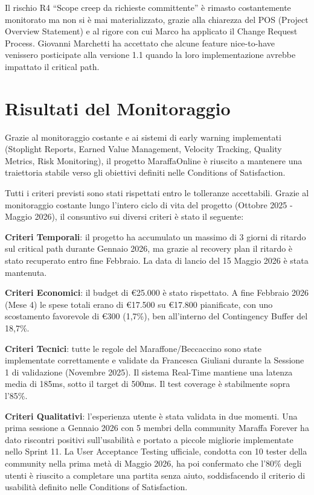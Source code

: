 Il rischio R4 ``Scope creep da richieste committente'' è rimasto costantemente monitorato ma non si è mai materializzato, grazie alla chiarezza del POS (Project Overview Statement) e al rigore con cui Marco ha applicato il Change Request Process. Giovanni Marchetti ha accettato che alcune feature nice-to-have venissero posticipate alla versione 1.1 quando la loro implementazione avrebbe impattato il critical path.

\section{Risultati del Monitoraggio}

Grazie al monitoraggio costante e ai sistemi di early warning implementati (Stoplight Reports, Earned Value Management, Velocity Tracking, Quality Metrics, Risk Monitoring), il progetto MaraffaOnline è riuscito a mantenere una traiettoria stabile verso gli obiettivi definiti nelle Conditions of Satisfaction.

Tutti i criteri previsti sono stati rispettati entro le tolleranze accettabili. Grazie al monitoraggio costante lungo l'intero ciclo di vita del progetto (Ottobre 2025 - Maggio 2026), il consuntivo sui diversi criteri è stato il seguente:

\textbf{Criteri Temporali}: il progetto ha accumulato un massimo di 3 giorni di ritardo sul critical path durante Gennaio 2026, ma grazie al recovery plan il ritardo è stato recuperato entro fine Febbraio. La data di lancio del 15 Maggio 2026 è stata mantenuta.

\textbf{Criteri Economici}: il budget di €25.000 è stato rispettato. A fine Febbraio 2026 (Mese 4) le spese totali erano di €17.500 su €17.800 pianificate, con uno scostamento favorevole di €300 (1,7\%), ben all'interno del Contingency Buffer del 18,7\%.

\textbf{Criteri Tecnici}: tutte le regole del Maraffone/Beccaccino sono state implementate correttamente e validate da Francesca Giuliani durante la Sessione 1 di validazione (Novembre 2025). Il sistema Real-Time mantiene una latenza media di 185ms, sotto il target di 500ms. Il test coverage è stabilmente sopra l'85\%.

\textbf{Criteri Qualitativi}: l'esperienza utente è stata validata in due momenti. Una prima sessione a Gennaio 2026 con 5 membri della community Maraffa Forever ha dato riscontri positivi sull'usabilità e portato a piccole migliorie implementate nello Sprint 11. La User Acceptance Testing ufficiale, condotta con 10 tester della community nella prima metà di Maggio 2026, ha poi confermato che l'80\% degli utenti è riuscito a completare una partita senza aiuto, soddisfacendo il criterio di usabilità definito nelle Conditions of Satisfaction.

